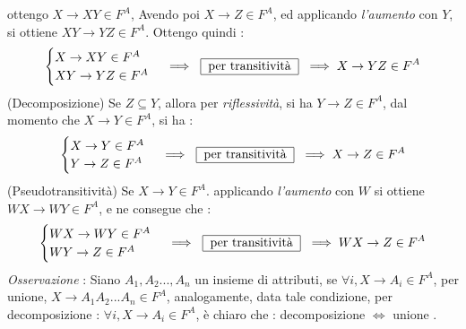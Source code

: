 \documentclass[12pt, letterpaper]{article}
\begin{document}
ottengo \(X\rightarrow XY\in F^A\), Avendo poi \(X\rightarrow Z\in F^A\), ed applicando \textit{l'aumento} con \(Y\), si ottiene
\(XY\rightarrow YZ\in F^A\). Ottengo quindi :\begin{equation}
    \begin{cases}
        X\rightarrow XY\in F^A\\
        XY\rightarrow YZ\in F^A
    \end{cases}
    \implies\text{ \begin{tabular}{|c|}\hline per transitività \\ \hline\end{tabular} }\implies  X\rightarrow YZ\in F^A
\end{equation}
(Decomposizione) Se \(Z\subseteq Y\), allora per \textit{riflessività}, si ha \(Y\rightarrow Z \in F^A\), dal momento che 
\(X\rightarrow Y\in F^A\), si ha :\begin{equation}
    \begin{cases}
        X\rightarrow Y\in F^A\\
        Y\rightarrow Z\in F^A
    \end{cases}
    \implies\text{ \begin{tabular}{|c|}\hline per transitività \\ \hline\end{tabular} }\implies  X\rightarrow Z\in F^A
\end{equation} 
(Pseudotransitività) Se  \(X\rightarrow Y\in F^A\). applicando \textit{l'aumento} con \(W\) si ottiene  \(WX\rightarrow WY\in F^A\),
e ne consegue che :\begin{equation}
    \begin{cases}
        WX\rightarrow WY\in F^A\\
        WY\rightarrow Z\in F^A
    \end{cases}
    \implies\text{ \begin{tabular}{|c|}\hline per transitività \\ \hline\end{tabular} }\implies  WX\rightarrow Z\in F^A
\end{equation} 
\textit{Osservazione }: Siano \(A_1,A_2...,A_n\) un insieme di attributi, se \(\forall i,X\rightarrow A_i\in F^A\), per 
unione, \(X\rightarrow A_1A_2...A_n\in F^A\), analogamente, data tale condizione, per decomposizione : \(\forall i,X\rightarrow A_i\in F^A\), 
è chiaro che : decomposizione \(\iff\) unione .
\end{document}
